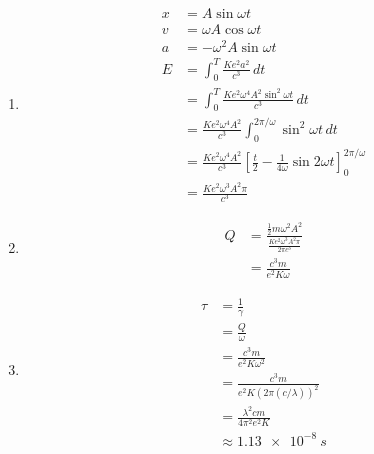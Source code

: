 \documentclass{article}
\begin{document}
\begin{enumerate}
  \item

        \begin{align*}
          x & = A \sin \omega t                                                                                                   \\
          v & = \omega A \cos \omega t                                                                                            \\
          a & = -\omega^2 A \sin \omega t                                                                                         \\
          E & = \int_0^T \frac{K e^2 a^2}{c^3} \,dt                                                                               \\
            & = \int_0^T \frac{K e^2 \omega^4 A^2 \sin^2 \omega t}{c^3} \,dt                                                      \\
            & = \frac{K e^2 \omega^4 A^2}{c^3} \int_0^{2 \pi / \omega} \sin^2 \omega t \,dt                                       \\
            & = \frac{K e^2 \omega^4 A^2}{c^3} \left[ \frac{t}{2} - \frac{1}{4 \omega} \sin 2 \omega t \right]_0^{2 \pi / \omega} \\
            & = \frac{K e^2 \omega^3 A^2 \pi}{c^3}
        \end{align*}

  \item

        \begin{align*}
          Q & = \frac{\frac{1}{2} m \omega^2 A^2}{\frac{K e^2 \omega^3 A^2 \pi}{2 \pi c^3}} \\
            & = \frac{c^3 m}{e^2 K \omega}
        \end{align*}

  \item

        \begin{align*}
          \tau & = \frac{1}{\gamma}                                         \\
               & = \frac{Q}{\omega}                                         \\
               & = \frac{c^3 m}{e^2 K \omega^2}                             \\
               & = \frac{c^3 m}{e^2 K \left( 2 \pi (c / \lambda) \right)^2} \\
               & = \frac{\lambda^2 c m}{4 \pi^2 e^2 K}                      \\
               & \approx \qty{1.13e-8}{s}
        \end{align*}
\end{enumerate}
\end{document}
